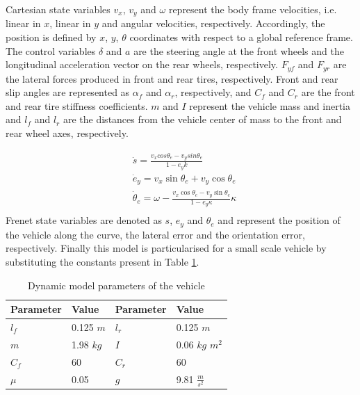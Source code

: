 \documentclass[a4paper,fleqn]{cas-sc}
\begin{document}
\noindent Cartesian state variables $v_x$, $v_y$ and $\omega$ represent the body frame velocities, i.e. linear in $x$, linear in $y$ and angular velocities, respectively. Accordingly, the position is defined by $x$, $y$, $\theta$ coordinates with respect to a global reference frame.
The control variables $\delta$ and $a$ are the steering angle at the front wheels and the longitudinal acceleration vector on the rear wheels, respectively.
$F_{yf}$ and $F_{yr}$ are the lateral forces produced in front and rear tires, respectively.
Front and rear slip angles are represented as $\alpha_f$ and $\alpha_r$, respectively, and $C_f$ and $C_r$ are the front and rear tire stiffness coefficients.
$m$ and $I$ represent the vehicle mass and inertia and $l_f$ and $l_r$ are the distances from the vehicle center of mass to the front and rear wheel axes, respectively. 

\begin{equation}
    \label{eq:frenet_model}
    \begin{aligned}
        & \dot s = \frac{v_x cos\theta_{e} - v_y sin\theta_{e}}{1 - e_{y} k } \\
		& \dot e_{y} = v_x \sin{\theta_{e}} + v_y \cos{\theta_{e}} \\
        & \dot \theta_{e} = \omega - \frac{v_x \cos{\theta_{e}} - v_y \sin{\theta_{e}} }{1 - e_{y} \kappa} \kappa \\
    \end{aligned}
\end{equation}
\noindent Frenet state variables are denoted as $s$, $e_{y}$ and $\theta_{e}$ and represent the position of the vehicle along the curve, the lateral error and the orientation error, respectively. Finally this model is particularised for a small scale vehicle by substituting the constants present in Table \ref{table:vehicle_parameters}. 

\begin{table}
    \caption{Dynamic model parameters of the vehicle}
    \label{table:vehicle_parameters}
    \centering
    \begin{tabular}{ l|l||l|l }
    \hline
    Parameter & Value & Parameter & Value \\
    \hline
    \hline
    $l_f$       & 0.125  $m$    & $l_r$    & 0.125  $m$  \\
    $m$         & 1.98  $kg$   & $I$      & 0.06 $kg$ $m^2$  \\
    $C_f$       & 60            & $C_r$    & 60 \\
    $\mu$ 	    & 0.05          & $g$      & 9.81 $\frac{m}{s^2}$ \\      
    \hline
    \end{tabular}
\end{table}    
\end{document}
